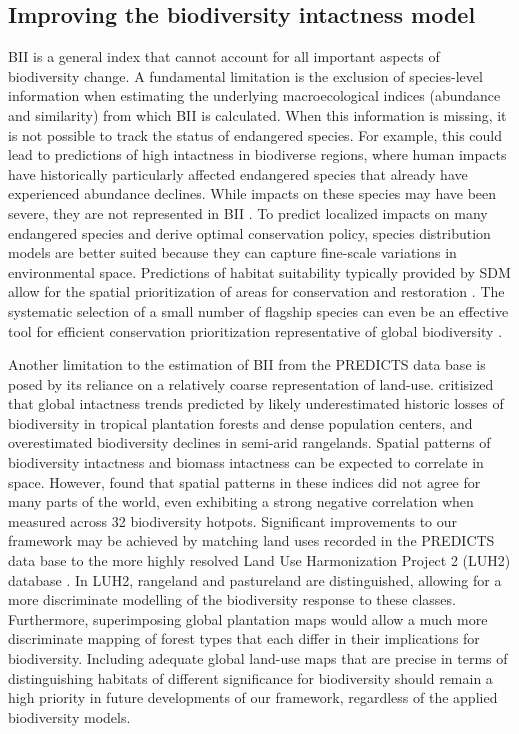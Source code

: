 \subsection{Improving the biodiversity intactness model}
BII is a general index that cannot account for all important aspects of biodiversity change. A fundamental limitation is the exclusion of species-level information when estimating the underlying macroecological indices (abundance and similarity) from which BII is calculated. When this information is missing, it is not possible to track the status of endangered species. For example, this could lead to predictions of high intactness in biodiverse regions, where human impacts have historically particularly affected endangered species that already have experienced abundance declines. While impacts on these species may have been severe, they are not represented in BII \citet{martin_biodiversity_2019}. To predict localized impacts on many endangered species and derive optimal conservation policy, species distribution models are better suited because they can capture fine-scale variations in environmental space. Predictions of habitat suitability typically provided by SDM allow for the spatial prioritization of areas for conservation and restoration \citep{wilson_applying_2011}. The systematic selection of a small number of flagship species can even be an effective tool for efficient conservation prioritization representative of global biodiversity \citep{mcgowan_conservation_2020}.

Another limitation to the estimation of BII from the PREDICTS data base is posed by its reliance on a relatively coarse representation of land-use. \citet{martin_biodiversity_2019} critisized that global intactness trends predicted by \citet{newbold_global_2016} likely underestimated historic losses of biodiversity in tropical plantation forests and dense population centers, and overestimated biodiversity declines in semi-arid rangelands. Spatial patterns of biodiversity intactness and biomass intactness \citep{erb_unexpectedly_2018} can be expected to correlate in space. However, \citet{martin_biodiversity_2019} found that spatial patterns in these indices did not agree for many parts of the world, even exhibiting a strong negative correlation when measured across 32 biodiversity hotpots. Significant improvements to our framework may be achieved by matching land uses recorded in the PREDICTS data base to the more highly resolved Land Use Harmonization Project 2 (LUH2) database \citep{hurtt_harmonization_2020}. In LUH2, rangeland and pastureland are distinguished, allowing for a more discriminate modelling of the biodiversity response to these classes. Furthermore, superimposing global plantation maps \citep{harris_spatial_2019} would allow a much more discriminate mapping of forest types that each differ in their implications for biodiversity. Including adequate global land-use maps that are precise in terms of distinguishing habitats of different significance for biodiversity should remain a high priority in future developments of our framework, regardless of the applied biodiversity models.


